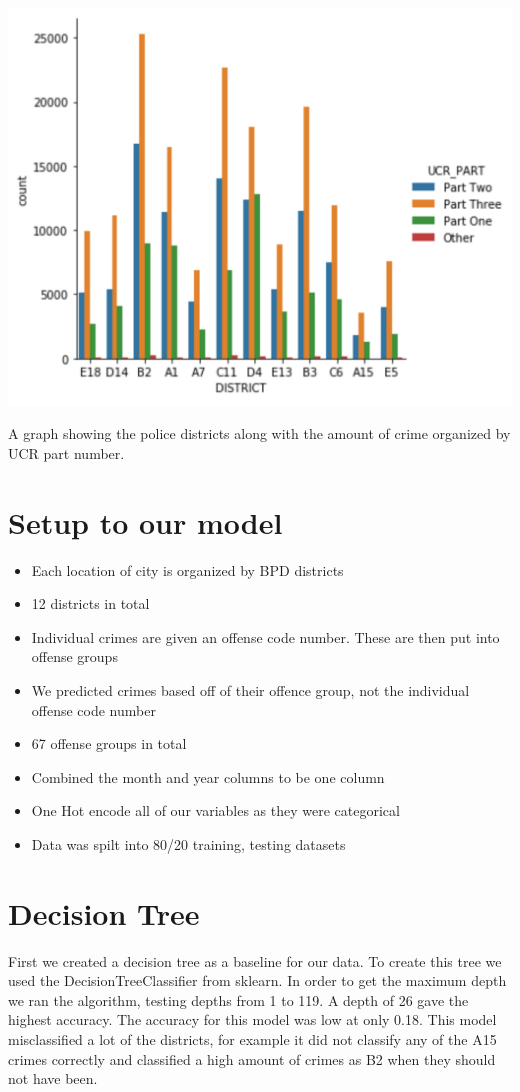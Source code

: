 \documentclass[a0,landscape]{a0poster}
\let\Section=\section
\def\section{\setcounter{equation}{0}\Section}
\newcommand{\1}{\bold{1}}
\begin{document}
\begin{multicols}{3}
\begin{center}
\centering
\includegraphics[scale = 2]{graph4paper1.png}

    A graph showing the police districts along with the amount of crime organized by UCR part number.
\end{center}
\section{Setup to our model}
\begin{itemize}
    \item Each location of city is organized by BPD districts
    \item 12 districts in total 
    \item Individual crimes are given an offense code number. These are then put into offense groups
    \item We predicted crimes based off of their offence group, not the individual offense code number
    \item 67 offense groups in total
    \item Combined the month and year columns to be one column
    \item One Hot encode all of our variables as they were categorical 
    \item Data was spilt into 80/20 training, testing datasets
\end{itemize}

\section{Decision Tree}
First we created a decision tree as a baseline for our data. To create this tree we used the DecisionTreeClassifier from sklearn. In order to get the maximum depth we ran the algorithm, testing depths from 1 to 119. A depth of 26 gave the highest accuracy. The accuracy for this model was low at only 0.18. This model misclassified a lot of the districts, for example it did not classify any of the A15 crimes correctly and classified a high amount of crimes as B2 when they should not have been.


\end{multicols}
\end{document}
